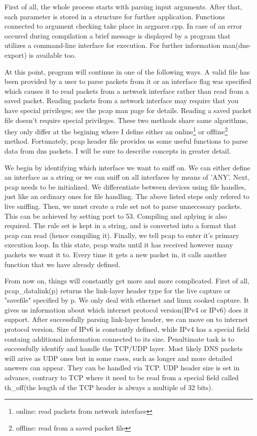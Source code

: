 \documentclass[11pt,a4paper]{article}
\begin{document}
First of all, the whole process starts with parsing input arguments. After that, each parameter is stored in a structure for further application. Functions connected to argument checking take place in argparer.cpp. In case of an error occured during compilation a brief message is displayed by a program that utilizes a command-line interface for execution. For further information man(dns-export) is available too.

At this point, program will continue in one of the following ways. A valid file has been provided by a user to parse packets from it or an interface flag was specified which causes it to read packets from a network interface rather than read from a saved packet. Reading packets from a network interface may require that you have special privileges; see the pcap man page for details. Reading a saved packet file doesn't require special privileges. These two methods share same algorithms, they only differ at the begining where I define either an online\footnote{online: read packets from network interface} or offline\footnote{offline: read from a saved packet file} method. Fortunately, pcap header file provides us some useful functions to parse data from dns packets. I will be sure to describe concepts in greater detail.

We begin by identifying which interface we want to sniff on. We can either define an interface as a string or we can sniff on all interfaces by means of 'ANY'. Next, pcap needs to be initialized. We differentiate between devices using file handles, just like an ordinary ones for file handling. The above listed steps only refered to live sniffing. Then, we must create a rule set not to parse unneccssary packets. This can be achieved by setting port to 53. Compiling and aplying is also required. The rule set is kept in a string, and is converted into a format that pcap can read (hence compiling it). Finally, we tell pcap to enter it's primary execution loop. In this state, pcap waits until it has received however many packets we want it to. Every time it gets a new packet in, it calls another function that we have already defined.

From now on, things will constantly get more and more complicated. First of all, pcap\_datalink(p) returns the link-layer header type for the live capture or "savefile" specified by p. We only deal with ethernet and linux cooked capture. It gives us information about which internet protocol version(IPv4 or IPv6) does it support. After successfully parsing link-layer header, we can move on to internet protocol version. Size of IPv6 is constantly defined, while IPv4 has a special field containg additional information connected to its size. Penultimate task is to successfully identify and handle the TCP/UDP layer. Most likely DNS packets will arive as UDP ones but in some cases, such as longer and more detailed answers can appear. They can be handled via TCP. UDP header size is set in advance, contrary to TCP where it need to be read from a special field called th\_off(the length of the TCP header is always a multiple of 32 bits).
\end{document}
